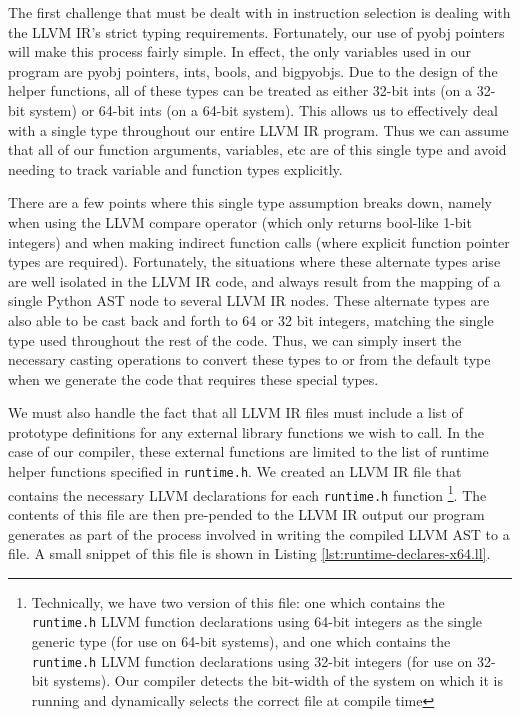 \documentclass[11pt,twocolumn]{article}
\begin{document}

The first challenge that must be dealt with in instruction selection
is dealing with the LLVM IR's strict typing requirements. Fortunately,
our use of pyobj pointers will make this process fairly simple. In
effect, the only variables used in our program are pyobj pointers,
ints, bools, and bigpyobjs. Due to the design of the helper functions,
all of these types can be treated as either 32-bit ints (on a 32-bit
system) or 64-bit ints (on a 64-bit system). This allows us to
effectively deal with a single type throughout our entire LLVM IR
program. Thus we can assume that all of our function arguments,
variables, etc are of this single type and avoid needing to track
variable and function types explicitly.

There are a few points where this single type assumption breaks down,
namely when using the LLVM compare operator (which only returns
bool-like 1-bit integers) and when making indirect function calls
(where explicit function pointer types are required). Fortunately, the
situations where these alternate types arise are well isolated in the
LLVM IR code, and always result from the mapping of a single Python
AST node to several LLVM IR nodes. These alternate types are also able
to be cast back and forth to 64 or 32 bit integers, matching the
single type used throughout the rest of the code. Thus, we can simply
insert the necessary casting operations to convert these types to or
from the default type when we generate the code that requires these
special types. 


We must also handle the fact that all LLVM IR files must include a
list of prototype definitions for any external library functions we wish
to call. In the case of our compiler, these external functions are
limited to the list of runtime helper functions specified in
\texttt{runtime.h}. We created an LLVM
IR file that contains the necessary LLVM declarations for each
\texttt{runtime.h} function
\footnote{Technically, we have two version
  of this file: one which contains the \texttt{runtime.h} LLVM
  function declarations using 64-bit integers as the single generic
  type (for use on 64-bit systems), and one which contains the
  \texttt{runtime.h} LLVM function declarations using 32-bit integers
  (for use on 32-bit systems). Our compiler detects the bit-width of
  the system on which it is running and dynamically selects the correct
  file at compile time}.
The contents of this file are then
pre-pended to the LLVM IR output our program generates as part of
the process involved in writing the compiled LLVM AST to a file. A
small snippet of this file is shown in Listing
\ref{lst:runtime-declares-x64.ll}.
\end{document}
